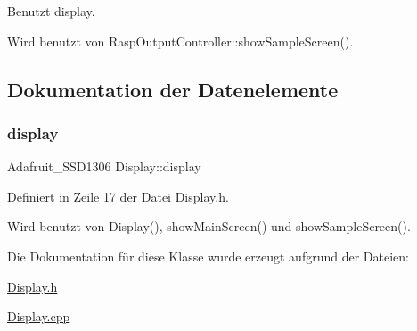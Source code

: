 Benutzt display.



Wird benutzt von Rasp\+Output\+Controller\+::show\+Sample\+Screen().



\subsection{Dokumentation der Datenelemente}
\mbox{\label{class_display_ad8b8ca65d118eb16461932c6630463a1}} 
\subsubsection{\texorpdfstring{display}{display}}
{\footnotesize\ttfamily Adafruit\+\_\+\+S\+S\+D1306 Display\+::display\hspace{0.3cm}{\ttfamily [private]}}



Definiert in Zeile 17 der Datei Display.\+h.



Wird benutzt von Display(), show\+Main\+Screen() und show\+Sample\+Screen().



Die Dokumentation für diese Klasse wurde erzeugt aufgrund der Dateien\+:\begin{DoxyCompactItemize}
\item 
\hyperlink{_display_8h}{Display.\+h}\item 
\hyperlink{_display_8cpp}{Display.\+cpp}\end{DoxyCompactItemize}
